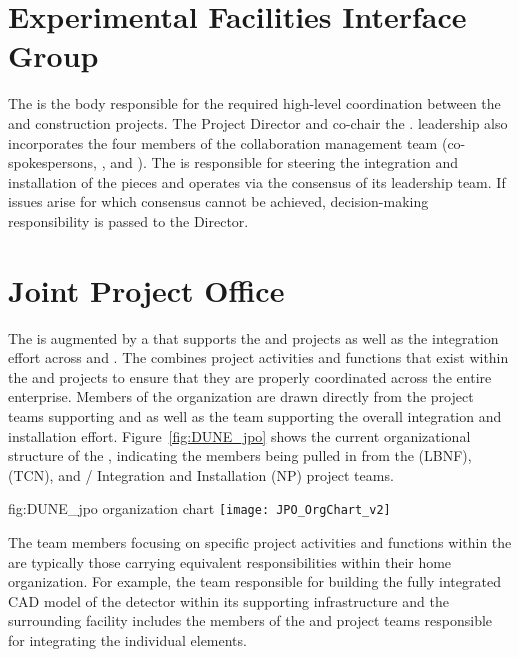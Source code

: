 \section{Experimental Facilities Interface Group}
\label{sec:efig}

The  is the body responsible for the required high-level
coordination between the  and  construction 
projects.  The  Project Director and  
co-chair the .   leadership also incorporates 
the four members of the  collaboration management 
team (co-spokespersons, , and ).  
The  is responsible for steering the integration and 
installation of the  pieces and operates via the 
consensus of its leadership team.  If issues arise for which consensus 
cannot be achieved, decision-making responsibility is passed to the 
 Director.

\section{Joint Project Office}
\label{sec:jpo}

The  is augmented by a  that supports the
 and  projects as well as the integration
effort across  and . The  
combines project activities and functions that exist within the 
 and  projects to ensure that they are 
properly coordinated across the entire enterprise.  Members of 
the  organization are drawn directly from the project 
teams supporting  and  as well as the 
team supporting the overall integration and installation effort.  
Figure~\ref{fig:DUNE_jpo} shows the current organizational 
structure of the , indicating the members being 
pulled in from the  (LBNF),  (TCN), and 
/ Integration and Installation (NP) 
project teams.
\begin{dunefigure}{fig:DUNE_jpo}
  { organization chart}
  \texttt{[image: JPO\_OrgChart\_v2]}
\end{dunefigure}
The team members focusing on specific project activities and 
functions within the  are typically those carrying 
equivalent responsibilities within their home organization.  For 
example, the  team responsible for building the fully 
integrated \threed CAD model of the detector within its supporting 
infrastructure and the surrounding facility includes the members 
of the  and  project teams responsible 
for integrating the individual elements.

